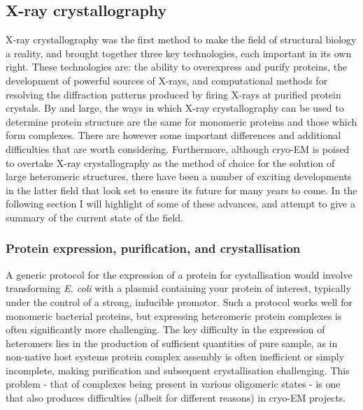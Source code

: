 \documentclass[a4paper,11pt,twoside,openright]{scrbook}
\begin{document}
\subsection{X-ray crystallography}
X-ray crystallography was the first method to make the field of structural biology a reality, and brought together three key technologies, each important in its own right. These technologies are: the ability to overexpress and purify proteins, the development of powerful sources of X-rays, and computational methods for resolving the diffraction patterns produced by firing X-rays at purified protein crystals. By and large, the ways in which X-ray crystallography can be used to determine protein structure are the same for monomeric proteins and those which form complexes. There are however some important differences and additional difficulties that are worth considering. Furthermore, although cryo-EM is poised to overtake X-ray crystallography as the method of choice for the solution of large heteromeric structures, there have been a number of exciting developments in the latter field that look set to ensure its future for many years to come. In the following section I will highlight of some of these advances, and attempt to give a summary of the current state of the field.

\subsubsection{Protein expression, purification, and crystallisation}
A generic protocol for the expression of a protein for cystallisation would involve transforming \textit{E. coli} with a plasmid containing your protein of interest, typically under the control of a strong, inducible promotor. Such a protocol works well for monomeric bacterial proteins, but expressing heteromeric protein complexes is often significantly more challenging. The key difficulty in the expression of heteromers lies in the production of sufficient quantities of pure sample, as in non-native host systems protein complex assembly is often inefficient or simply incomplete, making purification and subsequent crystallisation challenging. This problem - that of complexes being present in various oligomeric states - is one that also produces difficulties (albeit for different reasons) in cryo-EM projects.
\end{document}
